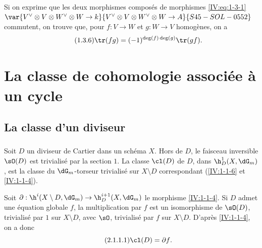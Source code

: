 Si on exprime que les deux morphismes composés de morphismes 
\eqref{IV:eq:1-3-1} $\var{V^\vee\otimes V\otimes W^\vee\otimes W\to k}{V^\vee\otimes V\otimes W^\vee\otimes W\to A}{S45-SOL-0552}$ commutent, on 
trouve que, pour $f:V\to W$ et $g:W\to V$ homogènes, on a 
\begin{equation*}\tag{1.3.6}\label{IV:eq:1-3-6}
  \tr(f g) = (-1)^{\deg(f)\deg(g)} \tr(g f) \text{.}
\end{equation*}




















\section{La classe de cohomologie associée à un cycle}\label{IV:2}










\subsection{La classe d'un diviseur}\label{IV:2-1}





\subsubsection{}\label{IV:2-1-1}

Soit $D$ un diviseur de Cartier dans un schéma $X$. Hors de $D$, le faisceau 
inversible $\sO(D)$ est trivialisé par la section $1$. La classe 
$\cl(D)$ de $D$, dans $\h_D^1(X,\dG_m)$, est la classe du 
$\dG_m$-torseur trivialisé sur $X\setminus D$ correspondant 
(\ref{IV:1-1-6} et \ref{IV:1-1-4}). 

Soit $\partial:\h^i(X\setminus D,\dG_m)\to \h_D^{i+1}(X,\dG_m)$ le morphisme 
\ref{IV:1-1-4}. Si $D$ admet une équation globale $f$, la multiplication par 
$f$ est un isomorphisme de $\sO(D)$, trivialisé par $1$ sur $X\setminus D$, 
avec $\sO$, trivialisé par $f$ sur $X\setminus D$. D'après \ref{IV:1-1-4}, 
on a donc 
\begin{equation*}\tag{2.1.1.1}\label{IV:eq:2-1-1}
  \cl(D) = \partial f \text{.}
\end{equation*}

